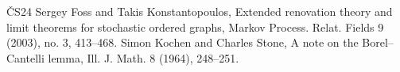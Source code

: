 \begin{thebibliography}{ČS24}
 Sergey Foss and Takis Konstantopoulos, Extended renovation theory and limit theorems for stochastic ordered graphs, Markov Process. Relat. Fields 9 (2003), no. 3, 413–468.
 Simon Kochen and Charles Stone, A note on the Borel–Cantelli lemma, Ill. J. Math. 8 (1964), 248–251.
\end{thebibliography}
